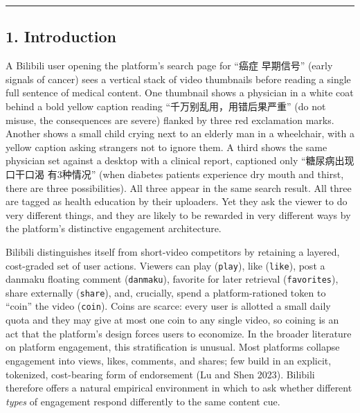 \documentclass[
  12pt,
]{article}
\begin{document}
\begin{center}\rule{0.5\linewidth}{0.5pt}\end{center}

\subsection{1. Introduction}\label{introduction}

A Bilibili user opening the platform's search page for ``癌症 早期信号''
(early signals of cancer) sees a vertical stack of video thumbnails
before reading a single full sentence of medical content. One thumbnail
shows a physician in a white coat behind a bold yellow caption reading
``千万别乱用，用错后果严重'' (do not misuse, the consequences are
severe) flanked by three red exclamation marks. Another shows a small
child crying next to an elderly man in a wheelchair, with a yellow
caption asking strangers not to ignore them. A third shows the same
physician set against a desktop with a clinical report, captioned only
``糖尿病出现口干口渴 有3种情况'' (when diabetes patients experience dry
mouth and thirst, there are three possibilities). All three appear in
the same search result. All three are tagged as health education by
their uploaders. Yet they ask the viewer to do very different things,
and they are likely to be rewarded in very different ways by the
platform's distinctive engagement architecture.

Bilibili distinguishes itself from short-video competitors by retaining
a layered, cost-graded set of user actions. Viewers can play
(\texttt{play}), like (\texttt{like}), post a danmaku floating comment
(\texttt{danmaku}), favorite for later retrieval (\texttt{favorites}),
share externally (\texttt{share}), and, crucially, spend a
platform-rationed token to ``coin'' the video (\texttt{coin}). Coins are
scarce: every user is allotted a small daily quota and they may give at
most one coin to any single video, so coining is an act that the
platform's design forces users to economize. In the broader literature
on platform engagement, this stratification is unusual. Most platforms
collapse engagement into views, likes, comments, and shares; few build
in an explicit, tokenized, cost-bearing form of endorsement (Lu and Shen
2023). Bilibili therefore offers a natural empirical environment in
which to ask whether different \emph{types} of engagement respond
differently to the same content cue.
\end{document}
